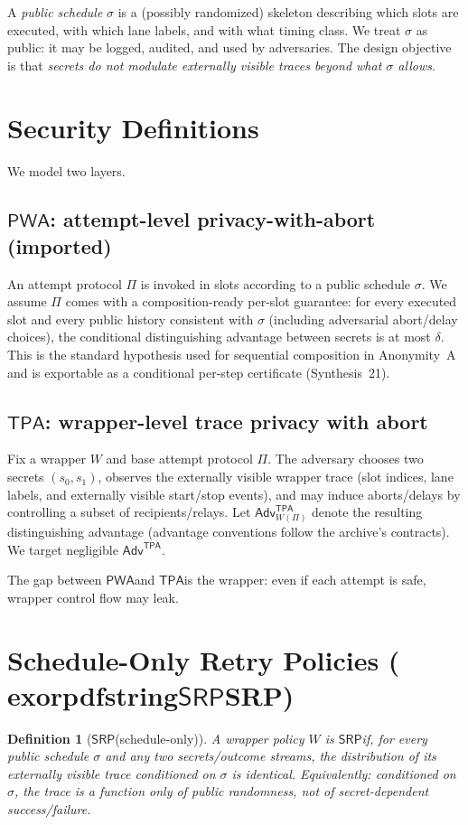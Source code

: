 \documentclass[11pt]{article}
\newtheorem{definition}{Definition}
\newcommand{\Adv}{\ensuremath{\mathsf{Adv}}}
\newcommand{\PWA}{\ensuremath{\mathsf{PWA}}}
\newcommand{\TPA}{\ensuremath{\mathsf{TPA}}}
\newcommand{\SRP}{\ensuremath{\mathsf{SRP}}}
\begin{document}
A \emph{public schedule} $\sigma$ is a (possibly randomized) skeleton describing which slots are executed, with which lane labels, and with what timing class.
We treat $\sigma$ as public: it may be logged, audited, and used by adversaries.
The design objective is that \emph{secrets do not modulate externally visible traces beyond what $\sigma$ allows}.

\section{Security Definitions}
We model two layers.

\subsection{\texorpdfstring{\PWA}{PWA}: attempt-level privacy-with-abort (imported)}
An attempt protocol $\Pi$ is invoked in slots according to a public schedule $\sigma$.
We assume $\Pi$ comes with a composition-ready per-slot guarantee:
for every executed slot and every public history consistent with $\sigma$
(including adversarial abort/delay choices), the conditional distinguishing advantage between secrets is at most $\delta$.
This is the standard hypothesis used for sequential composition in Anonymity~A and is exportable as a conditional per-step certificate (Synthesis~21).\cite{series:oddsinflation,series:condcert}

\subsection{\texorpdfstring{\TPA}{TPA}: wrapper-level trace privacy with abort}
Fix a wrapper $W$ and base attempt protocol $\Pi$.
The adversary chooses two secrets $(s_0,s_1)$, observes the externally visible wrapper trace
(slot indices, lane labels, and externally visible start/stop events), and may induce aborts/delays by controlling a subset of recipients/relays.
Let $\Adv^{\TPA}_{W(\Pi)}$ denote the resulting distinguishing advantage (advantage conventions follow the archive's contracts).\cite{series:advantagecontracts}
We target negligible $\Adv^{\TPA}$.

The gap between \PWA and \TPA is the wrapper: even if each attempt is safe, wrapper control flow may leak.

\section{Schedule-Only Retry Policies (	exorpdfstring{\SRP}{SRP})}
\begin{definition}[\SRP (schedule-only)]
A wrapper policy $W$ is \SRP if, for every public schedule $\sigma$ and any two secrets/outcome streams,
the distribution of its externally visible trace \emph{conditioned on $\sigma$} is identical.
Equivalently: conditioned on $\sigma$, the trace is a function only of public randomness, not of secret-dependent success/failure.
\end{definition}
\end{document}
